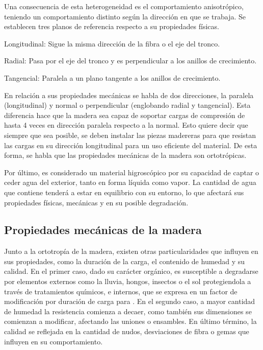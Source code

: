 Una consecuencia de esta heterogeneidad es el comportamiento anisotrópico, teniendo un comportamiento distinto según la dirección en que se trabaja. Se establecen tres planos de referencia respecto a su propiedades físicas.
\begin{itemize*}
	\item Longitudinal: Sigue la misma dirección de la fibra o el eje del tronco.
	\item Radial: Pasa por el eje del tronco y es perpendicular a los anillos de crecimiento.
	\item Tangencial: Paralela a un plano tangente a los anillos de crecimiento.
\end{itemize*}
En relación a sus propiedades mecánicas se habla de dos direcciones, la paralela (longitudinal) y normal o perpendicular (englobando radial y tangencial). Esta diferencia hace que la madera sea capaz de soportar cargas de compresión de hasta 4 veces en dirección paralela respecto a la normal. Esto quiere decir que siempre que sea posible, se deben instalar las piezas madereras para que resistan las cargas en su dirección longitudinal para un uso eficiente del material. De esta forma, se habla que las propiedades mecánicas de la madera son ortotrópicas.

Por último, es considerado un material higroscópico por su capacidad de captar o ceder agua del exterior, tanto en forma líquida como vapor. La cantidad de agua que contiene tenderá a estar en equilibrio con su entorno, lo que afectará sus propiedades físicas, mecánicas y en su posible degradación.

\subsection{Propiedades mecánicas de la madera}
Junto a la ortotropía de la madera, existen otras particularidades que influyen en sus propiedades, como la duración de la carga, el contenido de humedad y su calidad. En el primer caso, dado su carácter orgánico, es susceptible a degradarse por elementos externos como la lluvia, hongos, insectos o el sol protegiendola a través de tratamientos químicos, e internos, que se expresa en un factor de modificación por duración de carga para . En el segundo caso, a mayor cantidad de humedad la resistencia comienza a decaer, como también sus dimensiones se comienzan a modificar, afectando las uniones o ensambles. En último término, la calidad se reflejada en la cantidad de nudos, desviaciones de fibra o gemas que influyen en su comportamiento.

